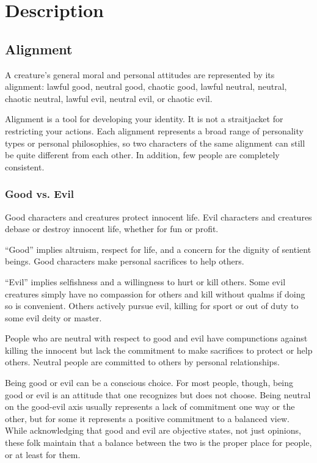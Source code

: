\chapter{Description}

\section{Alignment}\label{Alignment}
    A creature's general moral and personal attitudes are represented by its alignment: lawful good, neutral good, chaotic good, lawful neutral, neutral, chaotic neutral, lawful evil, neutral evil, or chaotic evil.

    Alignment is a tool for developing your identity.
    It is not a straitjacket for restricting your actions.
    Each alignment represents a broad range of personality types or personal philosophies, so two characters of the same alignment can still be quite different from each other.
    In addition, few people are completely consistent.

    \subsection{Good vs. Evil}
        Good characters and creatures protect innocent life. Evil characters and creatures debase or destroy innocent life, whether for fun or profit.

        ``Good'' implies altruism, respect for life, and a concern for the dignity of sentient beings. Good characters make personal sacrifices to help others.

        ``Evil'' implies selfishness and a willingness to hurt or kill others. Some evil creatures simply have no compassion for others and kill without qualms if doing so is convenient. Others actively pursue evil, killing for sport or out of duty to some evil deity or master.

        People who are neutral with respect to good and evil have compunctions against killing the innocent but lack the commitment to make sacrifices to protect or help others. Neutral people are committed to others by personal relationships.

        Being good or evil can be a conscious choice. For most people, though, being good or evil is an attitude that one recognizes but does not choose. Being neutral on the good-evil axis usually represents a lack of commitment one way or the other, but for some it represents a positive commitment to a balanced view. While acknowledging that good and evil are objective states, not just opinions, these folk maintain that a balance between the two is the proper place for people, or at least for them.

